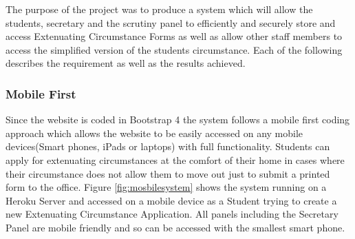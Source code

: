 \documentclass[../main.tex]{subfiles}
\begin{document}
\raggedright
The purpose of the project was to produce a system which will allow the students, secretary and the scrutiny panel to efficiently and securely store and access Extenuating Circumstance Forms as well as allow other staff members to access the simplified version of the students circumstance. Each of the following describes the requirement as well as the results achieved. 

\subsubsection{Mobile First}
Since the website is coded in Bootstrap 4\cite{bootstrapfour} the system follows a mobile first coding approach which allows the website to be easily accessed on any mobile devices(Smart phones, iPads or laptops) with full functionality. Students can apply for extenuating circumstances at the comfort of their home in cases where their circumstance does not allow them to move out just to submit a printed form to the office. Figure \ref{fig:mosbilesystem} shows the system running on a Heroku Server and accessed on a mobile device as a Student trying to create a new Extenuating Circumstance Application. All panels including the Secretary Panel are mobile friendly and so can be accessed with the smallest smart phone. 
\end{document}
